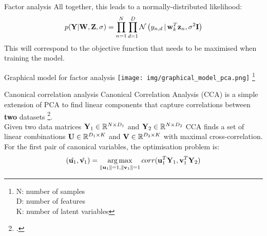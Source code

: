 \documentclass[aspectratio=169,notes]{beamer}
\newcommand\blfootnote[1]{%
  \begingroup
  \renewcommand\thefootnote{}\footnote{#1}%
  \addtocounter{footnote}{-1}%
  \endgroup
}
\begin{document}
	\begin{frame}{Factor analysis}
	All together, this leads to a normally-distributed likelihood:
	\[
		p({\bf Y}|{\bf W},{\bf Z},\sigma) = \prod_{n=1}^{N} \prod_{d=1}^{D} \mathcal{N}\left(y_{n,d} \,|\, {\bf w}_{k}^T {\bf z}_{n},\sigma^2 {\bf I}\right)
	\]
	This will correspond to the objective function that needs to be maximised when training the model.\\ \leavevmode\newline
	\end{frame}

	\begin{frame}{Graphical model for factor analysis}
	\centering
	\texttt{[image: img/graphical\_model\_pca.png]}
	\blfootnote{N: number of samples\\D: number of features\\K: number of latent variables}
	\end{frame}


	\begin{frame}{Canonical correlation analysis}
	Canonical Correlation Analysis (CCA) is a simple extension of PCA to find linear components that capture correlations between \textbf{two} datasets \footcite{Hotteling1936}.\\
	\leavevmode\newline
	Given two data matrices ${\bf Y}_1 \in \mathbb{R}^{N \times D_1}$ and ${\bf Y}_2 \in \mathbb{R}^{N \times D_2}$ CCA finds a set of linear combinations ${\bf U} \in \mathbb{R}^{D_1 \times K}$ and ${\bf V} \in \mathbb{R}^{D_2 \times K}$ with maximal cross-correlation.\\ 
	\leavevmode\newline
	For the first pair of canonical variables, the optimisation problem is:
	\[
		(\hat{{\bf u}_1}, \hat{{\bf v}_1}) = \operatorname*{arg\,max}_{\|{\bf u}_1\|=1,\|{\bf v}_1\|=1} corr({\bf u}_{1}^T {\bf Y}_1, {\bf v}_{1}^T {\bf Y}_2)
	\]
	\end{frame}
\end{document}
